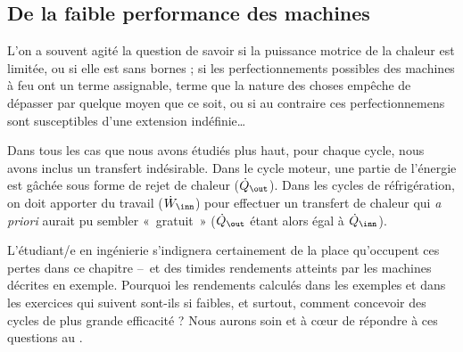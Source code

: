 	\subsection{De la faible performance des machines}

			L’on a souvent agité la question de savoir si la puissance motrice de la chaleur est limitée, ou si elle est sans bornes ; si les perfectionnements possibles des machines à feu ont un terme assignable, terme que la nature des choses empêche de dépasser par quelque moyen que ce soit, ou si au contraire ces perfectionnemens sont susceptibles d’une extension indéfinie…

		Dans tous les cas que nous avons étudiés plus haut, pour chaque cycle, nous avons inclus un transfert indésirable. Dans le cycle moteur, une partie de l’énergie est gâchée sous forme de rejet de chaleur ($\dot Q_\out$). Dans les cycles de réfrigération, on doit apporter du travail ($\dot W_\inn$) pour effectuer un transfert de chaleur qui \textit{a priori} aurait pu sembler «~gratuit~» ($\dot Q_\out$ étant alors égal à $\dot Q_\inn$).

		L’étudiant/e en ingénierie s’indignera certainement de la place qu’occupent ces pertes dans ce chapitre --\ et des timides rendements atteints par les machines décrites en exemple. Pourquoi les rendements calculés dans les exemples et dans les exercices qui suivent sont-ils si faibles, et surtout, comment concevoir des cycles de plus grande efficacité ? Nous aurons soin et à cœur de répondre à ces questions au \courssept.
